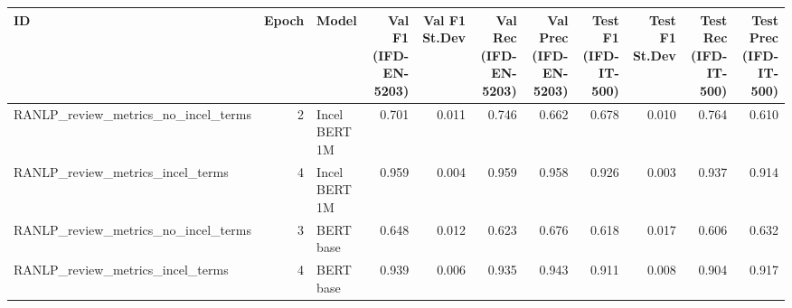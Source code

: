 \begin{tabular}{lrlrrrrrrrr}
\toprule
                                 ID &  Epoch &         Model &  Val F1 (IFD-EN-5203) &  Val F1 St.Dev &  Val Rec (IFD-EN-5203) &  Val Prec (IFD-EN-5203) &  Test F1 (IFD-IT-500) &  Test F1 St.Dev &  Test Rec (IFD-IT-500) &  Test Prec (IFD-IT-500) \\
\midrule
RANLP\_review\_metrics\_no\_incel\_terms &      2 & Incel BERT 1M &                 0.701 &          0.011 &                  0.746 &                   0.662 &                 0.678 &           0.010 &                  0.764 &                   0.610 \\
   RANLP\_review\_metrics\_incel\_terms &      4 & Incel BERT 1M &                 0.959 &          0.004 &                  0.959 &                   0.958 &                 0.926 &           0.003 &                  0.937 &                   0.914 \\
RANLP\_review\_metrics\_no\_incel\_terms &      3 &     BERT base &                 0.648 &          0.012 &                  0.623 &                   0.676 &                 0.618 &           0.017 &                  0.606 &                   0.632 \\
   RANLP\_review\_metrics\_incel\_terms &      4 &     BERT base &                 0.939 &          0.006 &                  0.935 &                   0.943 &                 0.911 &           0.008 &                  0.904 &                   0.917 \\
\bottomrule
\end{tabular}
